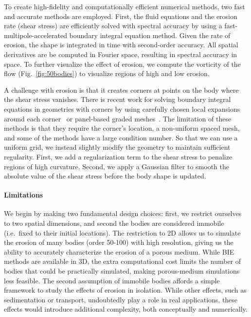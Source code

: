 \documentclass[preprint, 10pt]{elsarticle}
\begin{document}
To create high-fidelity and computationally efficient numerical methods,
two fast and accurate methods are employed.  First, the fluid equations
and the erosion rate (shear stress) are efficiently solved with spectral
accuracy by using a fast-multipole-accelerated boundary integral
equation method.  Given the rate of erosion, the shape is integrated in
time with second-order accuracy.  All spatial derivatives are be
computed in Fourier space, resulting in spectral accuracy in space.
To further visualize the effect of erosion, we compute the
vorticity of the flow (Fig.~\ref{fig:50bodies}) to visualize regions
of high and low erosion.

A challenge with erosion is that it creates corners at points on the
body where the shear stress vanishes.  There is recent work for solving
boundary integral equations in geometries with corners by using
carefully chosen local expansions around each corner~\cite{rac-ser2017,
ser-rok2016} or panel-based graded meshes~\cite{hel2011,
gil-hao-mar2014, bre2012}.  The limitation of these methods is that they
require the corner's location, a non-uniform spaced mesh, and some of
the methods have a large condition number.  So that we can use a uniform
grid, we instead slightly modify the geometry to maintain sufficient
regularity.  First, we add a regularization term to the shear stress to
penalize regions of high curvature.  Second, we apply a Gaussian filter
to smooth the absolute value of the shear stress before the body shape
is updated.

\paragraph{Limitations} 

We begin by making two fundamental design choices: first, we restrict ourselves to two spatial dimensions, and second the bodies are considered immobile (i.e.~fixed to their initial locations). The restriction to 2D allows us to simulate the erosion of many bodies (order 50-100) with high resolution, giving us the ability to accurately characterize the erosion of a porous medium. While BIE methods are available in 3D, the extra computational cost limits the number of bodies that could be practically simulated, making porous-medium simulations less feasible. The second assumption of immobile bodies affords a simple framework to study the effects of erosion in isolation. While other effects, such as sedimentation or transport, undoubtedly play a role in real applications, these effects would introduce additional complexity, both conceptually and numerically. 
\end{document}
